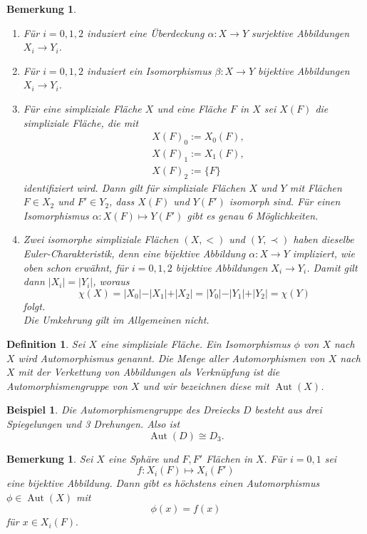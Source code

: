 \documentclass[12pt,titlepage,twoside,cleardoublepage]{article}
\theoremstyle{nummermitklammern}
\newtheorem{bsp}[temp]{Beispiel}
\newtheorem{definition}[temp]{Definition}
\newtheorem{bemerkung}[temp]{Bemerkung}
\newtheorem{definition}[zahl]{Definition}
\newtheorem{bsp}[zahl]{Beispiel}
\newtheorem{bemerkung}[zahl]{Bemerkung}
\numberwithin{equation}{section}
\DeclareMathOperator{\Aut}{Aut}
\begin{document}
\begin{bemerkung}
\begin{enumerate}
\item
Für $i=0,1,2$ induziert eine Überdeckung $\alpha:X\to Y$ surjektive Abbildungen $X_{i} \to Y_{i}$.
\item 
Für $i=0,1,2$ induziert ein Isomorphismus $\beta:X \to Y$  bijektive Abbildungen $X_{i} \to Y_{i}$.
\item
Für eine simpliziale Fläche $X$ und eine Fläche $F$ in $X$ sei $X(F)$ die simpliziale Fläche, die mit 
\begin{align*}
&X(F)_0:=X_0(F),\\
&X(F)_1:= X_1(F),\\
&X(F)_2:= \{F\} 
\end{align*}
 identifiziert wird.
Dann gilt für simpliziale Flächen $X$ und $Y$ mit Flächen $F \in X_2$ und $F' \in Y_2$, dass $X(F)$ und $Y(F')$ isomorph sind. Für einen Isomorphismus $\alpha : X(F)\mapsto Y(F')$ gibt es genau 6 Möglichkeiten.
\item
 Zwei isomorphe simpliziale Flächen $(X,<)$ und $(Y, \prec)$ haben dieselbe Euler-Charakteristik, denn eine bijektive Abbildung $\alpha:X \to Y$ impliziert, wie oben schon erwähnt, für $i=0,1,2$ bijektive Abbildungen  $X_i \to Y_i$. Damit gilt dann $\vert X_i \vert =\vert Y_i \vert $, woraus
 \[
\chi(X) =\vert X_0 \vert - \vert X_1\vert +\vert X_2 \vert = \vert Y_0 \vert - \vert Y_1\vert +\vert Y_2 \vert =\chi(Y)
 \]
 folgt. \\
 Die Umkehrung gilt im Allgemeinen nicht.
\end{enumerate}
\end{bemerkung}
\begin{definition}
Sei $X$ eine simpliziale Fläche. Ein Isomorphismus $\phi$ von
$X$ nach $X$ wird \emph{Automorphismus} genannt. Die Menge aller Automorphismen von $X$ nach $X$ mit der Verkettung von Abbildungen als Verknüpfung ist die Automorphismengruppe von $X$ und wir bezeichnen diese mit $\Aut(X)$. 
\end{definition}
\begin{bsp}
Die Automorphismengruppe des Dreiecks $D$ besteht aus drei 
Spiegelungen und 3 Drehungen. Also ist
\[
\Aut(D)\cong D_3.
\]
\end{bsp}
\begin{bemerkung}
Sei $X$ eine Sphäre und $F,F'$ Flächen in $X.$ Für $i=0,1$ sei 
\[
f:X_i(F)\mapsto X_i(F')  
\] 
eine bijektive Abbildung. Dann gibt es höchstens einen Automorphismus $\phi \in \Aut(X)$ mit 
\[
\phi(x)=f(x) 
\]
für $x\in X_i(F).$
\end{bemerkung}
\end{document}

